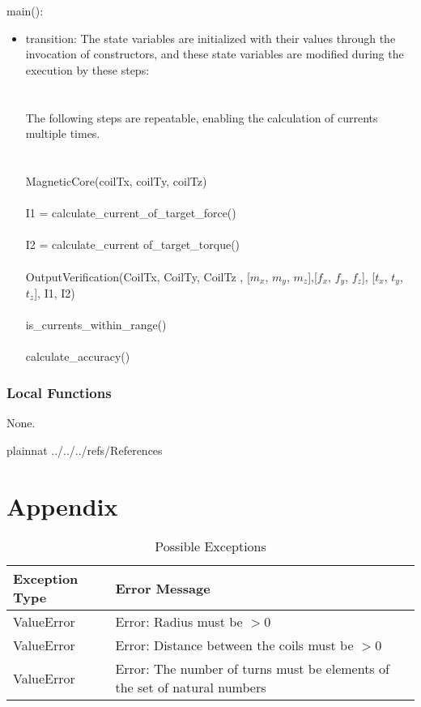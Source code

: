 \documentclass[12pt, titlepage]{article}
\begin{document}
\noindent main():
\begin{itemize}
\item transition: The state variables are initialized with their values through the invocation of constructors, and these state variables are modified during the execution by these steps:\\

\\
\\
The following steps are repeatable, enabling the calculation of currents multiple times.\\
\\
\\

MagneticCore(coilTx, coilTy, coilTz)\\
\\
I1 = calculate\_current\_of\_target\_force()\\
\\
I2 = calculate\_current of\_target\_torque()\\
\\
OutputVerification(CoilTx,  CoilTy,  CoilTz , [$m_x$, $m_y$, $m_z$],[$f_x$, $f_y$, $f_z$], [$t_x$, $t_y$, $t_z$], I1, I2)\\
\\
is\_currents\_within\_range()\\
\\
calculate\_accuracy()\\

\end{itemize}

\subsubsection{Local Functions}
None.
\newpage

 {plainnat}
 {../../../refs/References}

\newpage

\section{Appendix} \label{Appendix}


\begin{longtable}{l p{12cm}}
\caption{Possible Exceptions} \\
\toprule
\textbf{Exception Type} & \textbf{Error Message} \\
\midrule
ValueError & Error: Radius must be $> 0$ \\
ValueError & Error: Distance between the coils must be $> 0$ \\
ValueError & Error: The number of turns must be elements of the set of natural numbers\\
\bottomrule
\end{longtable}
\end{document}
